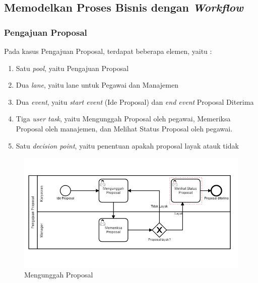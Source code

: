 \subsection{Memodelkan Proses Bisnis dengan \textit{Workflow}}
\label{hasilstudi_workflow}

\subsubsection{Pengajuan Proposal}
\label{workflow_kasus1}
Pada kasus Pengajuan Proposal, terdapat beberapa elemen, yaitu :
\begin{enumerate}
	\item Satu \textit{pool}, yaitu Pengajuan Proposal
	\item Dua \textit{lane}, yaitu lane untuk Pegawai dan Manajemen
	\item Dua \textit{event}, yaitu \textit{start event} (Ide Proposal) dan \textit{end event} Proposal Diterima
	\item Tiga \textit{user task}, yaitu Mengunggah Proposal oleh pegawai, Memeriksa Proposal oleh manajemen, dan Melihat Status Proposal oleh pegawai.
	\item Satu \textit{decision point}, yaitu penentuan apakah proposal layak atauk tidak
\end{enumerate}

	\begin{figure}[H]
			\centering
			\includegraphics[scale=0.5]{Gambar/Bab-3/Kasus2-3}
			\caption{Mengunggah Proposal} 
			\label{fig:workflow_mengunggahproposal}
	\end{figure}
	
